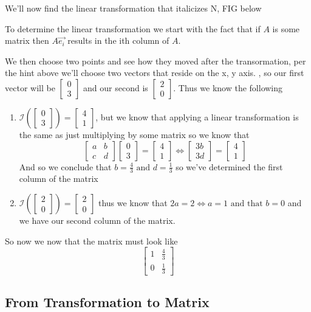\documentclass[notoc,notitlepage]{tufte-book}
\newcommand\mat[1]{\begin{bmatrix}#1\end{bmatrix}}
\begin{document}
\begin{ex}
    We'll now find the linear transformation that italicizes N, FIG below

    To determine the linear transformation we start with the fact that if $A$ is some matrix then $A \vec{e_i} $ results in the ith column of $A$.

    We then choose two points and see how they moved after the transormation, per the hint above we'll choose two vectors that reside on the x, y axis. , so our first vector will be $\mat{ 0 \\ 3 }$ and our second is $\mat{ 2 \\ 0 }$. Thus we know the following
    \begin{enumerate}
        \item $\mathcal{I}\left(\mat{ 0 \\ 3 }\right) = \mat{ 4 \\ 1 }$, but we know that applying a linear transformation is the same as just multiplying by some matrix so we know that
            \begin{equation*}
                \mat{ a & b \\ c & d } \mat{ 0 \\ 3 } = \mat{ 4 \\ 1 } \Leftrightarrow \mat{ 3b \\ 3d } = \mat{ 4 \\ 1 }
            \end{equation*}
            And so we conclude that $b = \frac{4}{3} \text{ and } d = \frac{1}{3}$ so we've determined the first column of the matrix
        \item $\mathcal{I}\left(\mat{ 2 \\ 0 }\right) = \mat{ 2 \\ 0 }$ thus we know that $2a = 2 \Leftrightarrow a = 1 \text{ and that } b = 0$ and we have our second column of the matrix.
    \end{enumerate}
    So now we now that the matrix must look like
    \begin{equation*}
        \mat{ 1 & \frac{4}{3} \\ 0 & \frac{1}{3} }                      
    \end{equation*}
\end{ex}

\subsection{From Transformation to Matrix}%
\label{sub:from_transformation_to_matrix}
\end{document}
